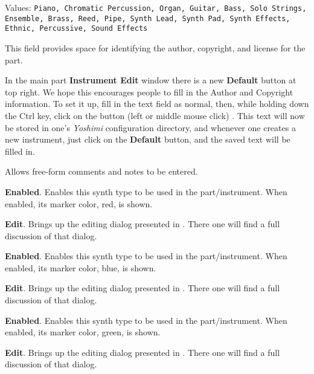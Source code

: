    Values: \texttt{Piano, Chromatic Percussion, Organ, Guitar, Bass,
              Solo Strings, Ensemble, Brass, Reed, Pipe,
              Synth Lead, Synth Pad, Synth Effects, Ethnic,
              Percussive, Sound Effects}

   This field provides space for identifying the author, copyright, and
   license for the part.

   In the main part \textbf{Instrument Edit} window there is a new
   \textbf{Default} button at top right.
   We hope this encourages people
   to fill in the Author and Copyright information.
   To set it up, fill in the text field as normal,
   then, while holding down the Ctrl key, click on the button
   (left or middle mouse click) . This text will now be stored in
   one's \textsl{Yoshimi} configuration directory,
   and whenever one creates a new instrument, just
   click on the \textbf{Default} button, and the saved text will be
   filled in.

   Allows free-form comments and notes to be entered.


   \begin{enumber}
      \item \textbf{Enabled}.
      Enables this synth type to be used in the part/instrument.
      When enabled, its marker color, red, is shown.
      \item \textbf{Edit}.
      Brings up the editing dialog presented in
      .
      There one will find a full discussion of that dialog.
   \end{enumber}


   \begin{enumber}
      \item \textbf{Enabled}.
      Enables this synth type to be used in the part/instrument.
      When enabled, its marker color, blue, is shown.
      \item \textbf{Edit}.
      Brings up the editing dialog presented in
      .
      There one will find a full discussion of that dialog.
   \end{enumber}


   \begin{enumber}
      \item \textbf{Enabled}.
      Enables this synth type to be used in the part/instrument.
      When enabled, its marker color, green, is shown.
      \item \textbf{Edit}.
      Brings up the editing dialog presented in
      .
      There one will find a full discussion of that dialog.
   \end{enumber}

